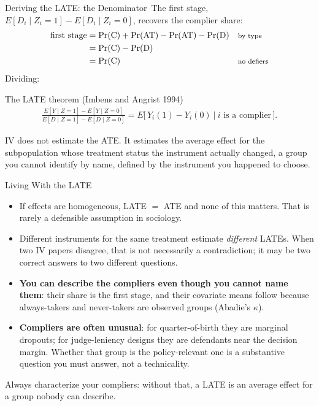 \documentclass[aspectratio=169,11pt,xcolor=dvipsnames]{beamer}
\newcommand{\srcp}[1]{{\scriptsize\color{gray}(#1)}}
\newcommand{\E}{E}
\newcommand{\core}{\,\raisebox{0.6pt}{\textcolor{corestar}{$\bigstar$}}}
\begin{document}
\begin{frame}{Deriving the LATE: the Denominator\core}
The first stage, $\E[D_i\mid Z_i=1] - \E[D_i\mid Z_i=0]$, recovers the complier share:
\begin{align*}
  \text{first stage}
  &= \Pr(\text{C}) + \Pr(\text{AT}) - \Pr(\text{AT}) - \Pr(\text{D})
     && \text{\footnotesize by type} \\
  &= \Pr(\text{C}) - \Pr(\text{D}) \\
  &= \Pr(\text{C})
     && \text{\footnotesize no defiers}
\end{align*}
\vskip3pt
Dividing:
\begin{block}{The LATE theorem \srcp{Imbens and Angrist 1994}}
\begin{align*}
  \frac{\E[Y\mid Z=1] - \E[Y\mid Z=0]}{\E[D\mid Z=1]-\E[D\mid Z=0]}
  = \E\big[\,Y_i(1) - Y_i(0)\ \big|\ \text{$i$ is a complier}\,\big] .
\end{align*}
\end{block}
\vskip3pt
\alert{IV does not estimate the ATE.} It estimates the average effect for the
subpopulation whose treatment status the instrument actually changed, a group
you cannot identify by name, defined by the instrument you happened to choose.
\end{frame}

\begin{frame}{Living With the LATE\core}
\begin{itemize}\itemsep3pt
  \item If effects are homogeneous, LATE $=$ ATE and none of this matters. That is
        rarely a defensible assumption in sociology.
  \item Different instruments for the same treatment estimate \emph{different}
        LATEs. When two IV papers disagree, that is not necessarily a
        contradiction; it may be two correct answers to two different questions.
  \item \textbf{You can describe the compliers even though you cannot name them}:
        their share is the first stage, and their covariate means follow because
        always-takers and never-takers are observed groups (Abadie's $\kappa$).
  \item \textbf{Compliers are often unusual}: for quarter-of-birth they are
        marginal dropouts; for judge-leniency designs they are defendants near the
        decision margin. Whether that group is the policy-relevant one is a
        substantive question you must answer, not a technicality.
\end{itemize}
\vskip2pt
\alert{Always characterize your compliers}: without that, a LATE is an average
effect for a group nobody can describe.
\end{frame}
\end{document}
